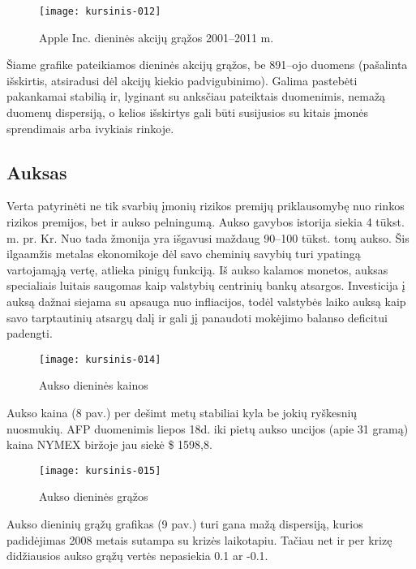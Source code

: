 \documentclass[12pt, a14paper, lithuanian]{article}
\begin{document}
\begin{figure}[H]
  \centering
\texttt{[image: kursinis-012]}
  \caption{Apple Inc. dieninės akcijų grąžos 2001--2011 m.}
  \label{fig:7}
\end{figure}
             
Šiame grafike pateikiamos dieninės akcijų grąžos, be 891--ojo duomens (pašalinta išskirtis, atsiradusi dėl akcijų kiekio padvigubinimo). Galima pastebėti pakankamai stabilią ir, lyginant su anksčiau pateiktais duomenimis, nemažą duomenų dispersiją, o kelios išskirtys gali būti susijusios su kitais įmonės sprendimais arba ivykiais rinkoje. \\

\subsection{Auksas}

Verta patyrinėti ne tik svarbių įmonių rizikos premijų priklausomybę nuo rinkos rizikos premijos, bet ir
aukso pelningumą. Aukso gavybos istorija siekia 4 tūkst. m. pr. Kr. Nuo tada žmonija yra išgavusi maždaug 90--100 tūkst. tonų aukso. Šis ilgaamžis metalas ekonomikoje dėl savo cheminių savybių turi ypatingą vartojamąją vertę, atlieka pinigų funkciją. Iš aukso kalamos monetos, auksas specialiais luitais saugomas kaip valstybių centrinių bankų atsargos. Investicija į auksą dažnai siejama su apsauga nuo infliacijos, todėl valstybės laiko auksą kaip savo tarptautinių atsargų dalį ir gali jį panaudoti mokėjimo balanso deficitui padengti.\\

\begin{figure}[H]
  \centering
\texttt{[image: kursinis-014]}
  \caption{Aukso dieninės kainos}
  \label{fig:8}
\end{figure}

Aukso kaina (8 pav.) per dešimt metų stabiliai kyla be jokių ryškesnių nuosmukių. AFP duomenimis liepos 18d. iki pietų aukso uncijos (apie 31 gramą) kaina NYMEX biržoje jau siekė \$ 1598,8.


\begin{figure}[H]
  \centering
\texttt{[image: kursinis-015]}
  \caption{Aukso dieninės grąžos}
  \label{fig:9}
\end{figure}
             
Aukso dieninių grąžų grafikas (9 pav.) turi gana mažą dispersiją, kurios padidėjimas 2008 metais 
sutampa su krizės laikotapiu. Tačiau net ir per krizę didžiausios aukso grąžų vertės nepasiekia 0.1 ar -0.1. \\
\end{document}
